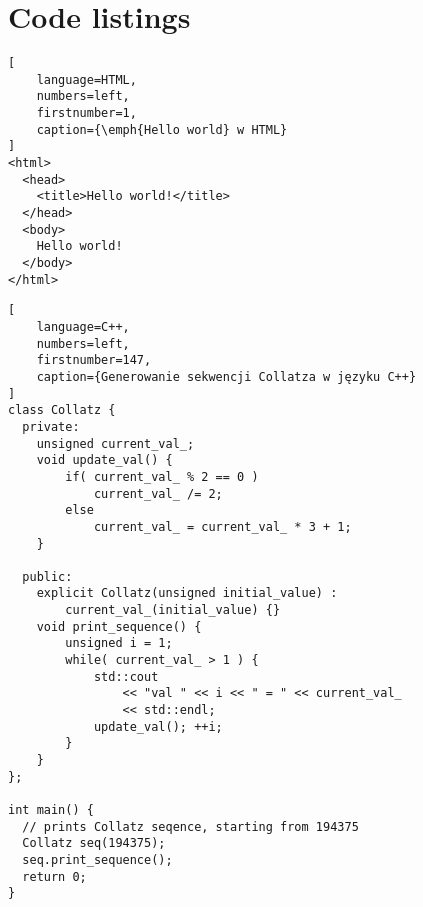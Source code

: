 \newpage %
\section{Code listings}

\lipsum[10]

\begin{addmargin}[6mm]{0mm}
\begin{lstlisting}[
    language=HTML,
    numbers=left,
    firstnumber=1,
    caption={\emph{Hello world} w HTML}
]
<html>
  <head>
    <title>Hello world!</title>
  </head>
  <body>
    Hello world!
  </body>
</html>
\end{lstlisting}
\end{addmargin}

\lipsum[11]

\begin{addmargin}[10mm]{0mm}
\begin{lstlisting}[
    language=C++,
    numbers=left,
    firstnumber=147,
    caption={Generowanie sekwencji Collatza w języku C++}
]
class Collatz {
  private:
    unsigned current_val_;
    void update_val() {
        if( current_val_ % 2 == 0 )
            current_val_ /= 2;
        else
            current_val_ = current_val_ * 3 + 1;
    }

  public:
    explicit Collatz(unsigned initial_value) : 
        current_val_(initial_value) {}
    void print_sequence() {
        unsigned i = 1;
        while( current_val_ > 1 ) {
            std::cout
                << "val " << i << " = " << current_val_
                << std::endl;
            update_val(); ++i;
        }
    }
};

int main() {
  // prints Collatz seqence, starting from 194375
  Collatz seq(194375);
  seq.print_sequence();
  return 0;
}
\end{lstlisting}
\end{addmargin}

\lipsum[12]
